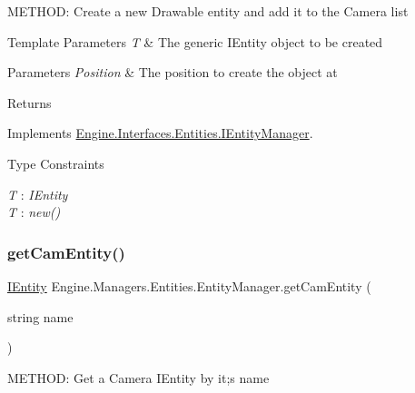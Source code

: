 M\+E\+T\+H\+OD\+: Create a new Drawable entity and add it to the Camera list 


\begin{DoxyTemplParams}{Template Parameters}
{\em T} & The generic I\+Entity object to be created\\
\hline
\end{DoxyTemplParams}

\begin{DoxyParams}{Parameters}
{\em Position} & The position to create the object at\\
\hline
\end{DoxyParams}
\begin{DoxyReturn}{Returns}

\end{DoxyReturn}


Implements \hyperlink{a00442_a36f4ce84282acb366896ebec20677cce}{Engine.\+Interfaces.\+Entities.\+I\+Entity\+Manager}.

\begin{Desc}
\item[Type Constraints]\begin{description}
\item[{\em T} : {\em I\+Entity}]\item[{\em T} : {\em new()}]\end{description}
\end{Desc}
\mbox{\label{a00518_ab3ff805a060af38748444e520995d8fa}} 
\subsubsection{\texorpdfstring{get\+Cam\+Entity()}{getCamEntity()}}
{\footnotesize\ttfamily \hyperlink{a00438}{I\+Entity} Engine.\+Managers.\+Entities.\+Entity\+Manager.\+get\+Cam\+Entity (\begin{DoxyParamCaption}\item[{string}]{name }\end{DoxyParamCaption})\hspace{0.3cm}{\ttfamily [inline]}}



M\+E\+T\+H\+OD\+: Get a Camera I\+Entity by it;s name 


